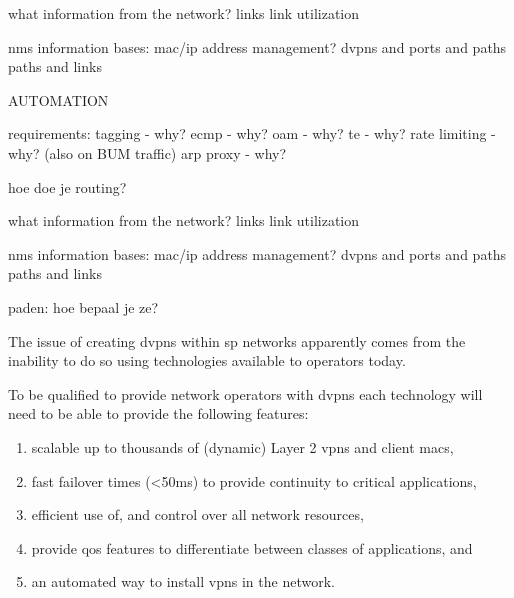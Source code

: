 what information from the network?
links
link utilization


nms information bases:
mac/ip address management?
dvpns and ports and paths
paths and links




AUTOMATION

requirements:
tagging - why?
ecmp - why?
oam - why?
te - why? 
rate limiting - why? (also on BUM traffic)
arp proxy - why?

hoe doe je routing?

what information from the network?
links
link utilization


nms information bases:
mac/ip address management?
dvpns and ports and paths
paths and links


paden:
hoe bepaal je ze?


The issue of creating \acp{dvpn} within \ac{sp} networks apparently comes from the inability to do so using technologies available to operators today. 

To be qualified to provide network operators with \acp{dvpn} each technology will need to be able to provide the following features:

\begin{enumerate}
	\item scalable up to thousands of (dynamic) Layer 2 \acp{vpn} and client \acsp{mac},
	\item fast failover times (<50ms) to provide continuity to critical applications,
	\item efficient use of, and control over all network resources,
	\item provide \acl{qos} features to differentiate between classes of applications, and
	\item an automated way to install \acp{vpn} in the network.
\end{enumerate}

